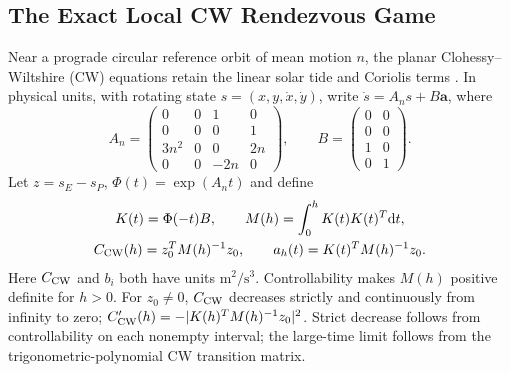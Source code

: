 \documentclass[journal,a4paper]{IEEEtran}
\newcommand{\dd}{\mathrm d}
\begin{document}
\subsection{The Exact Local CW Rendezvous Game}
\label{sec:cwgame}
Near a prograde circular reference orbit of mean motion $n$, the planar
Clohessy--Wiltshire (CW) equations retain the linear solar tide and Coriolis
terms \cite{ClohessyWiltshire1960}. In physical units, with rotating state
$s=(x,y,\dot x,\dot y)$, write $\dot s=A_ns+B\mathbf a$, where
\begin{equation}
 A_n=\begin{pmatrix}0&0&1&0\\0&0&0&1\\3n^2&0&0&2n\\0&0&-2n&0\end{pmatrix},
 \qquad B=\begin{pmatrix}0&0\\0&0\\1&0\\0&1\end{pmatrix}.
\end{equation}
Let $z=s_E-s_P$, $\Phi(t)=\exp(A_nt)$ and define
\begin{equation}
\begin{gathered}
 K(t)=\Phi(-t)B,\qquad M(h)=\int_0^h K(t)K(t)^T\dd t,\\
 C_{\rm CW}(h)=z_0^TM(h)^{-1}z_0,\qquad
 a_h(t)=K(t)^TM(h)^{-1}z_0.
\end{gathered}
\label{eq:CWgram}
\end{equation}
Here $C_{\rm CW}$ and $b_i$ both have units $\mathrm{m^2/s^3}$.
Controllability makes $M(h)$ positive definite for $h>0$. For $z_0\ne0$,
$C_{\rm CW}$ decreases strictly and continuously from infinity to zero;
$C_{\rm CW}'(h)=-|K(h)^TM(h)^{-1}z_0|^2$. Strict decrease follows from
controllability on each nonempty interval; the large-time limit follows
from the trigonometric-polynomial CW transition matrix.
\end{document}
